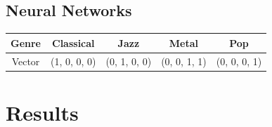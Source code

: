 \documentclass{article} %
\begin{document}
\subsection{Neural Networks}



\begin{center}
\begin{tabular}{| c | c | c | c | c |}
\hline
Genre & Classical & Jazz & Metal & Pop \\
\hline
Vector & (1, 0, 0, 0) & (0, 1, 0, 0) & (0, 0, 1, 1) & (0, 0, 0, 1) \\
\hline
\end{tabular}
\end{center}




\section{Results}
\end{document}
